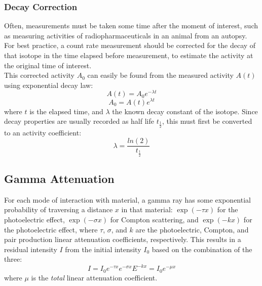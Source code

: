 \documentclass[12pt]{article}
\begin{document}
\subsubsection{Decay Correction}
Often, measurements must be taken some time after the moment of interest, such as measuring activities of radiopharmaceuticals in an animal from an autopsy.
For best practice, a count rate measurement should be corrected for the decay of that isotope in the time elapsed before measurement, to estimate the activity at the original time of interest.\\

This corrected activity $A_0$ can easily be found from the measured activity $A(t)$ using exponential decay law\cite{tsoulfanidis_measurement_2015}:
\begin{equation}
    A(t)=A_0e^{-\lambda t}
\end{equation}
\begin{equation}\label{eq:dec_cor}
    A_0=A(t)e^{\lambda t}
\end{equation}
where $t$ is the elapsed time, and $\lambda$ the known decay constant of the isotope.
Since decay properties are usually recorded as half life $t_{\frac{1}{2}}$, this must first be converted to an activity coefficient\cite{tsoulfanidis_measurement_2015}:
\begin{equation}
    \lambda = \frac{ln(2)}{t_{\frac{1}{2}}}
\end{equation}

\subsection{Gamma Attenuation}
For each mode of interaction with material, a gamma ray has some exponential probability of traversing a distance $x$ in that material: $\exp(-\tau x)$ for the photoelectric effect, $\exp(-\sigma x)$ for Compton scattering, and $\exp(-kx)$ for the photoelectric effect\cite{npre_lab_6_manual_2025}, where $\tau$, $\sigma$, and $k$ are the photoelectric, Compton, and pair production linear attenuation coefficients, respectively.
This results in a residual intensity $I$ from the initial intensity $I_0$ based on the combination of the three\cite{npre_lab_6_manual_2025}:
\begin{equation}
    \label{eq:tot-atten}
    I=I_0e^{-\tau x}e^{-\sigma x}E^{-kx}=I_0e^{-\mu x}
\end{equation}
where $\mu$ is the \emph{total} linear attenuation coefficient.\\
\end{document}
